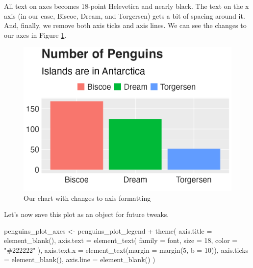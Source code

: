 \documentclass[
]{book}
\newenvironment{Shaded}{\begin{snugshade}}{\end{snugshade}}
\newcommand{\AttributeTok}[1]{\textcolor[rgb]{0.77,0.63,0.00}{#1}}
\newcommand{\DecValTok}[1]{\textcolor[rgb]{0.00,0.00,0.81}{#1}}
\newcommand{\FunctionTok}[1]{\textcolor[rgb]{0.00,0.00,0.00}{#1}}
\newcommand{\NormalTok}[1]{#1}
\newcommand{\OtherTok}[1]{\textcolor[rgb]{0.56,0.35,0.01}{#1}}
\newcommand{\SpecialCharTok}[1]{\textcolor[rgb]{0.00,0.00,0.00}{#1}}
\newcommand{\StringTok}[1]{\textcolor[rgb]{0.31,0.60,0.02}{#1}}
\begin{document}
All text on axes becomes 18-point Helevetica and nearly black. The text on the x axis (in our case, Biscoe, Dream, and Torgersen) gets a bit of spacing around it. And, finally, we remove both axis ticks and axis lines. We can see the changes to our axes in Figure \ref{fig:penguins-plot-axes-plot}.

\begin{figure}
\includegraphics[width=1\linewidth]{custom-theme_files/figure-latex/penguins-plot-axes-plot-1} \caption{Our chart with changes to axis formatting}\label{fig:penguins-plot-axes-plot}
\end{figure}

Let's now save this plot as an object for future tweaks.

\begin{Shaded}
\begin{Highlighting}[]
\NormalTok{penguins\_plot\_axes }\OtherTok{\textless{}{-}}\NormalTok{ penguins\_plot\_legend }\SpecialCharTok{+}
  \FunctionTok{theme}\NormalTok{(}
    \AttributeTok{axis.title =} \FunctionTok{element\_blank}\NormalTok{(),}
    \AttributeTok{axis.text =} \FunctionTok{element\_text}\NormalTok{(}
      \AttributeTok{family =}\NormalTok{ font,}
      \AttributeTok{size =} \DecValTok{18}\NormalTok{,}
      \AttributeTok{color =} \StringTok{"\#222222"}
\NormalTok{    ),}
    \AttributeTok{axis.text.x =} \FunctionTok{element\_text}\NormalTok{(}\AttributeTok{margin =} \FunctionTok{margin}\NormalTok{(}\DecValTok{5}\NormalTok{, }\AttributeTok{b =} \DecValTok{10}\NormalTok{)),}
    \AttributeTok{axis.ticks =} \FunctionTok{element\_blank}\NormalTok{(),}
    \AttributeTok{axis.line =} \FunctionTok{element\_blank}\NormalTok{()}
\NormalTok{  )}
\end{Highlighting}
\end{Shaded}
\end{document}
